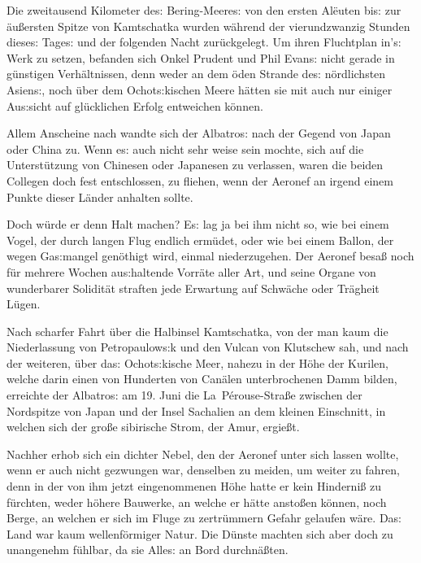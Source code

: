 \documentclass[oneside,12pt]{book}
\newcommand{\s}{s:}
\begin{document}
Die zweitausend Kilometer de{\s} Bering-Meere{\s} von den ersten
Al\"euten bi{\s} zur \"au{\ss}ersten Spitze von Kamtschatka wurden
w\"ahrend der vierundzwanzig Stunden diese{\s} Tage{\s} und der
folgenden Nacht zur\"uckgelegt. Um ihren Fluchtplan in'{\s} Werk zu
setzen, befanden sich Onkel Prudent und Phil Evan{\s} nicht gerade in
g\"unstigen Verh\"altnissen, denn weder an dem \"oden Strande de{\s}
n\"ordlichsten Asien{\s}, noch \"uber dem Ochot{\s}kischen Meere
h\"atten sie mit auch nur einiger Au{\s}sicht auf gl\"ucklichen
Erfolg entweichen k\"onnen.

Allem Anscheine nach wandte sich der {\glqq}Albatro{\s}{\grqq} nach
der Gegend von Japan oder China zu. Wenn e{\s} auch nicht sehr weise
sein mochte, sich auf die Unterst\"utzung von Chinesen oder Japanesen
zu verlassen, waren die beiden Collegen doch fest entschlossen, zu
fliehen, wenn der Aeronef an irgend einem Punkte dieser L\"ander
anhalten sollte.

Doch w\"urde er denn Halt machen? E{\s} lag ja bei ihm nicht so, wie
bei einem Vogel, der durch langen Flug endlich erm\"udet, oder wie
bei einem Ballon, der wegen Ga{\s}mangel gen\"othigt wird, einmal
niederzugehen. Der Aeronef besa{\ss} noch f\"ur mehrere Wochen
au{\s}haltende Vorr\"ate aller Art, und seine Organe von wunderbarer
Solidit\"at straften jede Erwartung auf Schw\"ache oder Tr\"agheit
L\"ugen.

Nach scharfer Fahrt \"uber die Halbinsel Kamtschatka, von der man
kaum die Niederlassung von Petropaulow{\s}k und den Vulcan von
Klutschew sah, und nach der weiteren, \"uber da{\s} Ochot{\s}kische
Meer, nahezu in der H\"ohe der Kurilen, welche darin einen von
Hunderten von Can\"alen unterbrochenen Damm bilden, erreichte der
{\glqq}Albatro{\s}{\grqq} am 19. Juni die La~P\'erouse-Stra{\ss}e
zwischen der Nordspitze von Japan und der Insel Sachalien an dem
kleinen Einschnitt, in welchen sich der gro{\ss}e sibirische Strom,
der Amur, ergie{\ss}t.

Nachher erhob sich ein dichter Nebel, den der Aeronef unter sich
lassen wollte, wenn er auch nicht gezwungen war, denselben zu meiden,
um weiter zu fahren, denn in der von ihm jetzt eingenommenen H\"ohe
hatte er kein Hinderni{\ss} zu f\"urchten, weder h\"ohere Bauwerke,
an welche er h\"atte ansto{\ss}en k\"onnen, noch Berge, an welchen er
sich im Fluge zu zertr\"ummern Gefahr gelaufen w\"are. Da{\s} Land
war kaum wellenf\"ormiger Natur. Die D\"unste machten sich aber doch
zu unangenehm f\"uhlbar, da sie Alle{\s} an Bord durchn\"a{\ss}ten.
\end{document}
